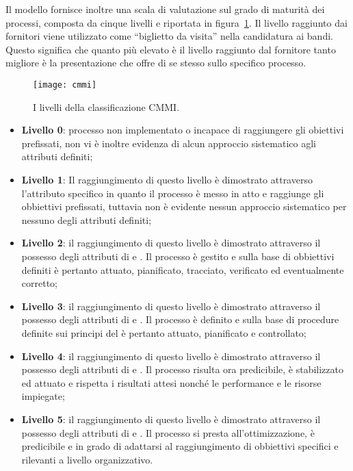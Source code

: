 Il modello fornisce inoltre una scala di valutazione sul grado di maturità dei processi, composta da cinque livelli e riportata in figura~\ref{fig:cmmi}. Il livello raggiunto dai fornitori viene utilizzato come ``biglietto da visita'' nella candidatura ai bandi. Questo significa che quanto più elevato è il livello raggiunto dal fornitore tanto migliore è la presentazione che offre di se stesso sullo specifico processo.

\begin{figure}[h]
\centering
\texttt{[image: cmmi]}
\caption{I livelli della classificazione CMMI.}\label{fig:cmmi}
\end{figure}

\begin{itemize}
\item \textbf{Livello 0}: processo non implementato o incapace di raggiungere gli obiettivi prefissati, non vi è inoltre evidenza di alcun approccio sistematico agli attributi definiti;

\item \textbf{Livello 1}: Il raggiungimento di questo livello è dimostrato attraverso l'attributo specifico  in quanto il processo è messo in atto e raggiunge gli obbiettivi prefissati, tuttavia non è evidente nessun approccio sistematico per nessuno degli attributi definiti;

\item \textbf{Livello 2}: il raggiungimento di questo livello è dimostrato attraverso il possesso degli attributi di  e . Il processo è gestito e sulla base di obbiettivi definiti è pertanto attuato, pianificato, tracciato, verificato ed eventualmente corretto;

\item \textbf{Livello 3}: il raggiungimento di questo livello è dimostrato attraverso il possesso degli attributi di  e . Il processo è definito e sulla base di procedure definite sui principi del  è pertanto attuato, pianificato e controllato;

\item \textbf{Livello 4}: il raggiungimento di questo livello è dimostrato attraverso il possesso degli attributi di  e . Il processo risulta ora predicibile, è stabilizzato ed attuato e rispetta i risultati attesi nonché le performance e le risorse impiegate;

\item\textbf{Livello 5}: il raggiungimento di questo livello è dimostrato attraverso il possesso degli attributi di  e . Il processo si presta all'ottimizzazione, è predicibile e in grado di adattarsi al raggiungimento di obbiettivi specifici e rilevanti a livello organizzativo.
\end{itemize}
\clearpage

